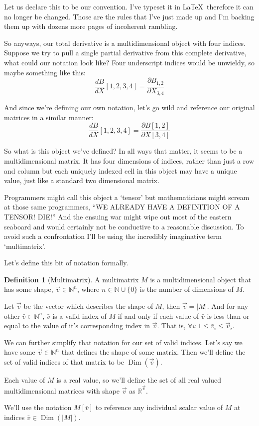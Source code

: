 \documentclass[12pt]{book}
\theoremstyle{plain}
\theoremstyle{definition}
\newtheorem{definition}{Definition}[chapter]
\theoremstyle{ppart}
\theoremstyle{case}
\theoremstyle{solution}
\DeclareMathOperator{\Dim}{Dim}
\newcommand{\shape}[1]{\left|#1\right|}
\begin{document}
Let us declare this to
be our convention. I've typeset it in \LaTeX ~therefore it can no longer be
changed. Those are the rules that I've just made up and I'm backing them up with
dozens more pages of incoherent rambling.

So anyways, our total derivative is a multidimensional object with four indices.
Suppose we try to pull a single partial derivative from this complete derivative,
what could our notation look like? Four underscript indices would be unwieldy,
so maybe something like this:
\[
\frac{dB}{dX}[1,2,3,4] = \frac{\partial B_{1,2}}{\partial X_{3,4}}
\]

And since we're defining our own notation, let's go wild and reference our original
matrices in a similar manner:
\[
\frac{dB}{dX}[1,2,3,4] = \frac{\partial B[1,2]}{\partial X[3,4]}
\]

So what is this object we've defined? In all ways that matter, it seems to be
a multidimensional matrix. It has four dimensions of indices, rather than just
a row and column but each uniquely indexed cell in this object may have a
unique value, just like a standard two dimensional matrix.

Programmers might call this object a `tensor' but mathematicians might
scream at those same programmers, ``WE ALREADY HAVE A DEFINITION OF A TENSOR! DIE!''
And the ensuing war might wipe out most of the eastern seaboard and would
certainly not be conductive to a reasonable discussion. To avoid such a
confrontation I'll be using the incredibly imaginative term `multimatrix'. 

Let's define this bit of notation formally.

\begin{definition}[Multimatrix]
A multimatrix $M$ is a multidimensional object that has some shape,
$\vec{v} \in \mathbb{N}^n$, where $n \in \mathbb{N} \cup \{0\}$
is the number of dimensions of $M$.

Let $\vec{v}$ be the vector which describes the shape of
$M$, then $\vec{v} = \shape{M}$. And for any other $\bar{v} \in \mathbb{N}^n$, $\bar{v}$
is a valid index of $M$ if and only if each value of $\bar{v}$ is less than or equal
to the value of it's corresponding index in $\vec{v}$.
That is, $\forall i: 1 \le \bar{v}_i \le \vec{v}_i$.

We can further simplify that notation for our set of valid indices. Let's say we have
some $\vec{v} \in \mathbb{N}^n$ that defines the shape of some matrix. Then we'll
define the set of valid indices of that matrix to be $\Dim(\vec{v})$. 

Each value of $M$ is a real value, so we'll define the set of all real valued
multidimensional matrices with shape $\vec{v}$ as $\mathbb{R}^{\vec{v}}$.

We'll use the notation $M[\bar{v}]$ to reference any individual scalar value of $M$
at indices $\bar{v} \in \Dim(\shape{M})$. 
\end{definition}
\end{document}
